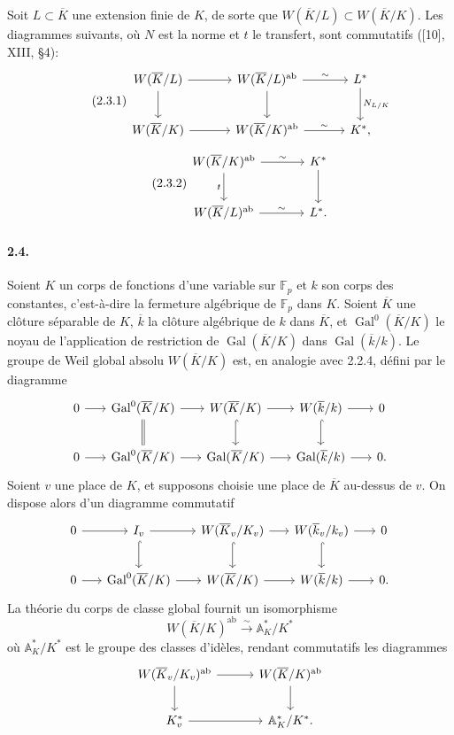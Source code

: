 \documentclass[10pt]{article}
\newcommand{\F}{\mathbb F}
\newcommand{\A}{\mathbb A}
\newcommand{\Gal}{\operatorname{Gal}}
\newcommand{\iso}{\xrightarrow{\sim}}
\providecommand{\ab}{\mathrm{ab}}
\providecommand{\ab}{\mathrm{ab}}
\begin{document}
Soit \(L\subset\overline K\) une extension finie de \(K\), de sorte que \(W(\overline K/L)\subset W(\overline K/K)\). Les diagrammes suivants, où \(N\) est la norme et \(t\) le transfert, sont commutatifs ([10], XIII, §4):
\[
\tag{2.3.1}
\begin{tikzcd}[column sep=3.3em,row sep=2.2em]
W(\overline K/L) \arrow[r] \arrow[d] &
W(\overline K/L)^{\ab} \arrow[r,"\sim"] \arrow[d] &
L^* \arrow[d,"N_{L/K}"]\\
W(\overline K/K) \arrow[r] &
W(\overline K/K)^{\ab} \arrow[r,"\sim"] &
K^* ,
\end{tikzcd}
\]
\[
\tag{2.3.2}
\begin{tikzcd}[column sep=3.5em,row sep=2.3em]
W(\overline K/K)^{\ab} \arrow[r,"\sim"] \arrow[d,"t"'] &
K^* \arrow[d]\\
W(\overline K/L)^{\ab} \arrow[r,"\sim"] &
L^* .
\end{tikzcd}
\]

\paragraph{2.4.} Soient \(K\) un corps de fonctions d'une variable sur \(\F_p\) et \(k\) son corps des constantes, c'est-à-dire la fermeture algébrique de \(\F_p\) dans \(K\). Soient \(\overline K\) une clôture séparable de \(K\), \(\overline k\) la clôture algébrique de \(k\) dans \(\overline K\), et \(\Gal^0(\overline K/K)\) le noyau de l'application de restriction de \(\Gal(\overline K/K)\) dans \(\Gal(\overline k/k)\). Le groupe de Weil global absolu \(W(\overline K/K)\) est, en analogie avec 2.2.4, défini par le diagramme
\[
\begin{tikzcd}[column sep=1.7em,row sep=2.1em]
0 \arrow[r] & \Gal^0(\overline K/K) \arrow[r] \arrow[d,equal] &
W(\overline K/K) \arrow[r] \arrow[d,hook] &
W(\overline k/k) \arrow[r] \arrow[d,hook] & 0\\
0 \arrow[r] & \Gal^0(\overline K/K) \arrow[r] &
\Gal(\overline K/K) \arrow[r] &
\Gal(\overline k/k) \arrow[r] & 0 .
\end{tikzcd}
\]
Soient \(v\) une place de \(K\), et supposons choisie une place de \(\overline K\) au-dessus de \(v\). On dispose alors d'un diagramme commutatif
\[
\begin{tikzcd}[column sep=1.6em,row sep=2.1em]
0 \arrow[r] & I_v \arrow[r] \arrow[d,hook] &
W(\overline K_v/K_v) \arrow[r] \arrow[d,hook] &
W(\overline k_v/k_v) \arrow[r] \arrow[d,hook] & 0\\
0 \arrow[r] & \Gal^0(\overline K/K) \arrow[r] &
W(\overline K/K) \arrow[r] &
W(\overline k/k) \arrow[r] & 0 .
\end{tikzcd}
\]
La théorie du corps de classe global fournit un isomorphisme
\[
W(\overline K/K)^{\ab}\iso\A_K^*/K^*
\]
où \(\A_K^*/K^*\) est le groupe des classes d'idèles, rendant commutatifs les diagrammes
\[
\begin{tikzcd}[column sep=3.0em,row sep=2.0em]
W(\overline K_v/K_v)^{\ab} \arrow[r] \arrow[d] &
W(\overline K/K)^{\ab} \arrow[d]\\
K_v^* \arrow[r] & \A_K^*/K^* .
\end{tikzcd}
\]
\end{document}

